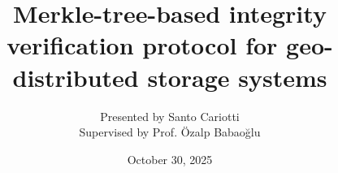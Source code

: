 \documentclass{beamer}
\title{Merkle-tree-based integrity verification protocol for geo-distributed storage
systems}
\author{Presented by Santo Cariotti\\Supervised by Prof. Özalp Babaoğlu}
\institute{Alma Mater Studiorum\\ Università di Bologna}
\date{October 30, 2025}
\begin{document}
\frame{\titlepage}

% 






\end{document}
